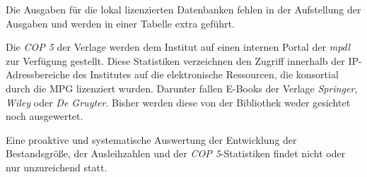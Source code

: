 Die Ausgaben für die lokal lizenzierten Datenbanken fehlen in der Aufstellung der Ausgaben und werden in einer Tabelle extra geführt.

Die \textit{\acrfull{COP 5}} der Verlage werden dem Institut auf einen internen Portal der \textit{\acrshort{mpdl}} zur Verfügung gestellt.
Diese Statistiken verzeichnen den Zugriff innerhalb der IP-Adressbereiche des Institutes auf die elektronische Ressourcen, 
die konsortial durch die \acrshort{MPG} lizenziert wurden. Darunter fallen E-Books der Verlage 
\textit{Springer}, \textit{Wiley} oder \textit{De Gruyter}. Bisher werden diese von der Bibliothek weder gesichtet noch ausgewertet.

Eine proaktive und systematische Auswertung der Entwicklung der Bestandsgröße, der Ausleihzahlen und der \textit{\acrshort{COP 5}}-Statistiken findet nicht
oder nur unzureichend statt. 


